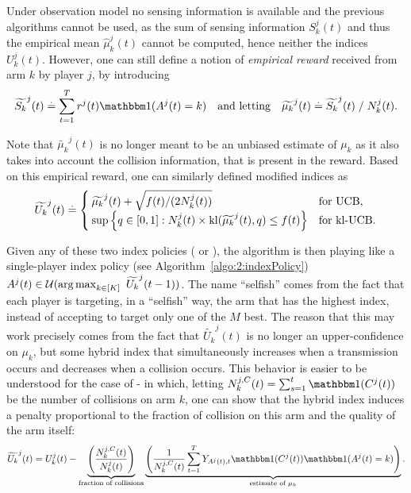 Under observation model \modeltrois{} no sensing information is available and the previous algorithms cannot be used, as the sum of sensing information $S_k^j(t)$ and thus the empirical mean $\widehat{\mu}_k^j(t)$ cannot be computed, hence neither the indices $U_k^j(t)$. However, one can still define a notion of \emph{empirical reward} received from arm $k$ by player $j$, by introducing
%
\begin{equation}
  \widetilde{S_k}^j(t) \eqdef \sum_{t=1}^T r^j(t) \indic(A^j(t) = k)
  \ \ \ \text{and letting} \ \ \ \widetilde{\mu_k}^j(t) \eqdef \widetilde{S_k}^j(t) \;/\; N_k^j(t).
\end{equation}

Note that $\widetilde{\mu_k}^j(t)$ is no longer meant to be an unbiased estimate of $\mu_k$ as it also takes into account the collision information, that is present in the reward. Based on this empirical reward, one can similarly defined modified indices as
%
\begin{equation}\label{eq:5:indexTilde}
  \widetilde{U_k}^j(t) \overset{.}{=} \begin{cases}
      \widetilde{\mu_k}^j(t)  + \sqrt{  f(t) / (2N_k^j(t))}
      &\text{for } \mathrm{UCB}, \\
      \sup\left\{ q \in [0, 1]: N_k^j(t)\times \mathrm{kl}(\widetilde{\mu_k}^j(t), q) \leq f(t) \right\}
      &\text{for } \mathrm{kl}\text{-}\mathrm{UCB}.
  \end{cases}
\end{equation}

Given any of these two index policies (\UCB{} or \klUCB), the \Selfish{} algorithm is then playing like a single-player index policy (see Algorithm~\ref{algo:2:indexPolicy})
$A^j(t) \in \cU(\argmax_{ k \in [K]} \ \widetilde{U_k}^j(t-1))$.
The name ``selfish'' comes from the fact that each player is targeting, in a ``selfish'' way, the arm that has the highest index, instead of accepting to target only one of the $M$ best.
The reason that this may work precisely comes from the fact that $\widetilde{U_k}^j(t)$ is no longer an upper-confidence on $\mu_k$,
but some hybrid index that simultaneously increases when a transmission occurs and decreases when a collision occurs.
%
This behavior is easier to be understood for the case of \Selfish-\UCB{} in which, letting $N_k^{j,C}(t) = \sum_{s=1}^t \indic(C^j(t))$ be the number of collisions on arm $k$, one can show that the hybrid \Selfish{} index induces a penalty proportional to the fraction of collision on this arm and the quality of the arm itself:
\begin{equation}
  \widetilde{U_k}^j(t) = U_k^j(t) -
  \underbrace{\left(\frac{N_k^{j,C}(t)}{N_k^j(t)}\right)}_{\text{fraction of collisions}}
  \underbrace{\left(\frac{1}{N_k^{j,C}(t)}\sum_{t=1}^{T}Y_{A^j(t),t} \indic(C^j(t)) \indic(A^j(t) = k)\right)}_{\text{estimate of } \mu_k }.
\end{equation}

